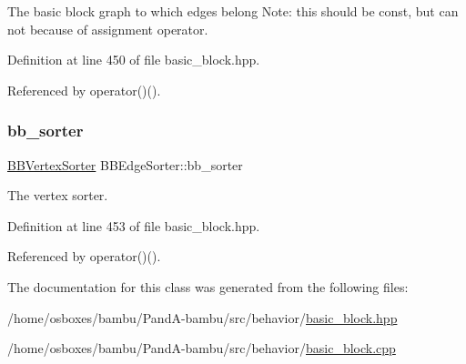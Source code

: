 The basic block graph to which edges belong Note\+: this should be const, but can not because of assignment operator. 



Definition at line 450 of file basic\+\_\+block.\+hpp.



Referenced by operator()().

\mbox{\label{classBBEdgeSorter_aaee082ca57b91b1ff89f3d6e8740e144}} 
\subsubsection{\texorpdfstring{bb\+\_\+sorter}{bb\_sorter}}
{\footnotesize\ttfamily \hyperlink{classBBVertexSorter}{B\+B\+Vertex\+Sorter} B\+B\+Edge\+Sorter\+::bb\+\_\+sorter\hspace{0.3cm}{\ttfamily [private]}}



The vertex sorter. 



Definition at line 453 of file basic\+\_\+block.\+hpp.



Referenced by operator()().



The documentation for this class was generated from the following files\+:\begin{DoxyCompactItemize}
\item 
/home/osboxes/bambu/\+Pand\+A-\/bambu/src/behavior/\hyperlink{basic__block_8hpp}{basic\+\_\+block.\+hpp}\item 
/home/osboxes/bambu/\+Pand\+A-\/bambu/src/behavior/\hyperlink{basic__block_8cpp}{basic\+\_\+block.\+cpp}\end{DoxyCompactItemize}
